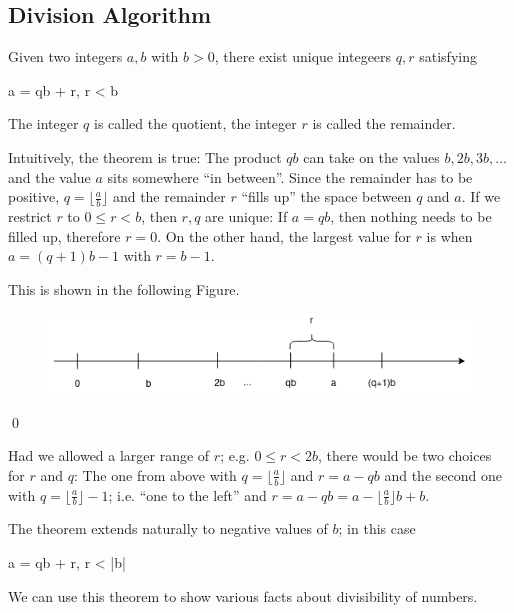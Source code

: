 
\subsection{Division Algorithm}

\begin{theorem}
  Given two integers $a,b$ with $b > 0$, there exist unique integeers $q, r$ satisfying

  \bee
  a = qb + r,  \leq r < b
  \eee

  The integer $q$ is called the quotient, the integer $r$ is called the remainder.
\end{theorem}

Intuitively, the theorem is true: The product $qb$ can take on the values $b, 2b, 3b, \dots$ and the value $a$ sits somewhere ``in between''. Since the remainder has to be positive, $q = \lfloor \frac{a}{b} \rfloor$ and the remainder $r$ ``fills up'' the space between $q$ and $a$. If we restrict $r$ to $0 \leq r < b$, then $r,q$ are unique: If $a = qb$, then nothing needs to be filled up, therefore $r = 0$. On the other hand, the largest value for $r$ is when $a = (q+1)b-1$ with $r = b-1$.

This is shown in the following Figure.

\begin{figure}[H]
\centering
\includegraphics[scale=0.7]{images/division_stuff_1.png}
\end{figure}

\qed

Had we allowed a larger range of $r$; e.g. $0 \leq r < 2b$, there would be two choices for $r$ and $q$: The one from above with $q = \lfloor \frac{a}{b}\rfloor$ and $r = a - qb$ and the second one with $q = \lfloor \frac{a}{b}\rfloor - 1$; i.e. ``one to the left'' and $r = a - qb = a - \lfloor \frac{a}{b}\rfloor b + b$.

The theorem extends naturally to negative values of $b$; in this case

\bee
a = qb + r,  \leq r < |b|
\eee

We can use this theorem to show various facts about divisibility of numbers.

